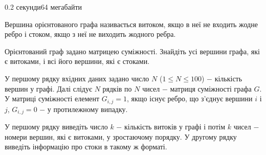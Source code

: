\begin{problem}{}{}{}{0.2 секунди}{64 мегабайти}

Вершина орієнтованого графа називається витоком, якщо в неї не входить жодне ребро і стоком, якщо з неї не 
виходить жодного ребра. 

Орієнтований граф задано матрицею суміжності. Знайдіть усі вершини графа, які є витоками, і всі його вершини, 
які є стоками.

\InputFile
У першому рядку вхідних даних задано число $N$ ($1 \le N \le 100$) $-$ кількість вершин у графі.
Далі слідує $N$ рядків по $N$ чисел $-$ матриця суміжності графа $G$. У матриці суміжності елемент $G_{i,j}=1$, якщо
існує ребро, що з'єднує вершини $i$ і $j$, $G_{i,j}=0$ $-$  у протилежному випадку.

\OutputFile
У першому рядку виведіть число $k$ $-$ кількість витоків у графі і потім $k$ чисел $-$ номери вершин, 
які є витоками, у зростаючому порядку. У другому рядку виведіть інформацію про стоки в такому ж форматі.

\Example
\begin{example}
%
\end{example}

\end{problem}

